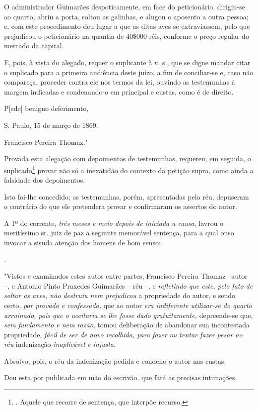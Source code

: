 O administrador Guimarães despoticamente, em face do peticionário,
dirigiu-se ao quarto, abriu a porta, soltou as galinhas, e alugou o
aposento a outra pessoa; e, com este procedimento deu lugar a que as
ditas aves se extraviassem, pelo que prejudicou o peticionário na
quantia de 40\$000 réis, conforme o preço regular do mercado da capital.

E, pois, à vista do alegado, requer o suplicante à v. s., que se digne
mandar citar o suplicado para a primeira audiência deste juízo, a fim de
conciliar-se e, caso não compareça, proceder contra ele nos termos da
lei, ouvindo as testemunhas à margem indicadas e condenando-o em
principal e custas, como é de direito.

P{[}ede{]} benigno deferimento,

S. Paulo, 15 de março de 1869.

Francisco Pereira Thomaz."

Provada esta alegação com depoimentos de testemunhas, requereu, em
seguida, o suplicado\footnote{. Aquele que recorre de sentença, que
  interpõe recurso.} provar não só a inexatidão do contexto da petição
supra, como ainda a falsidade dos depoimentos.

Isto foi-lhe concedido; as testemunhas, porém, apresentadas pelo réu,
depuseram o contrário do que ele pretendera provar e confirmaram os
assertos do autor.

A 1º do corrente, \emph{três meses e meio depois de iniciada a causa},
lavrou o meritíssimo sr. juiz de paz a seguinte memorável sentença, para
a qual ouso invocar a sisuda atenção dos homens de bom senso:

.

"Vistos e examinados estes autos entre partes, Francisco Pereira Thomaz
--autor --, e Antonio Pinto Praxedes Guimarães -- réu --, e
\emph{refletindo que este, pelo fato de soltar as aves, não destruiu nem
prejudicou} a propriedade do autor, e sendo certo, \emph{por provado e
confessado,} que ao autor \emph{era indiferente utilizar-se do quarto
arruinado, pois que o aceitaria se lhe fosse dado gratuitamente,}
depreende-se que, \emph{sem fundamento e nem razão}, tomou deliberação
de abandonar sua incontestada propriedade, \emph{fácil de ser de novo
recolhida, para fazer ou tentar fazer pesar ao réu} indenização
\emph{inaplicável e injusta}.

Absolvo, pois, o réu da indenização pedida e condeno o autor nas custas.

Dou esta por publicada em mão do escrivão, que fará as precisas
intimações.

